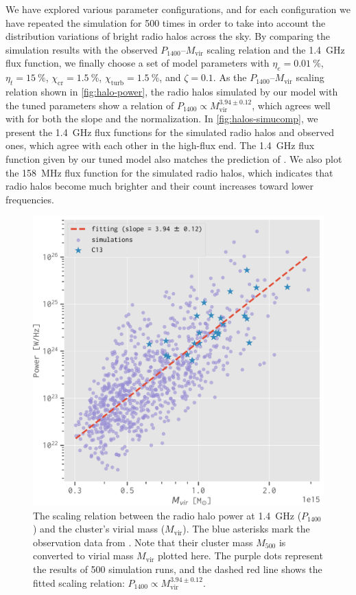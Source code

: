 \documentclass[twocolumn]{aastex62}
\newcommand{\R}[1]{\mathrm{#1}}
\newcommand{\editone}[1]{{\leavevmode\color{cyan}#1}}
\begin{document}
We have explored various parameter configurations,
and for each configuration we have repeated the simulation for 500 times
in order to take into account the distribution variations of bright
radio halos across the sky.
\editone{%
By comparing the simulation results with the observed
$P_{1400}$--$M_{\R{vir}}$ scaling relation and the \SI{1.4}{\GHz} flux
function, we finally choose a set of model parameters with
$\eta_e = \SI{0.01}{\percent}$,
$\eta_t = \SI{15}{\percent}$,
$\chi_{\R{cr}} = \SI{1.5}{\percent}$,
$\chi_{\R{turb}} = \SI{1.5}{\percent}$,
and $\zeta = 0.1$.
As the $P_{1400}$--$M_{\R{vir}}$ scaling relation shown in
\autoref{fig:halo-power}, the radio halos simulated by our model with the
tuned parameters show a relation of
$P_{1400} \propto M_{\R{vir}}^{3.94 \pm 0.12}$, which agrees well with
\citet{cassano2013} for both the slope and the normalization.
In \autoref{fig:halos-simucomp}, we present the \SI{1.4}{\GHz} flux
functions for the simulated radio halos and observed ones, which agree with
each other in the high-flux end.
The \SI{1.4}{\GHz} flux function given by our tuned model also matches
the prediction of \citet{cassano2012}.
We also plot the \SI{158}{\MHz} flux function for the simulated radio
halos, which indicates that radio halos become much brighter and their
count increases toward lower frequencies.
}

\begin{figure}
  \centering
  \includegraphics[width=\columnwidth]{halo-power-mvir}
  \caption{\label{fig:halo-power}\editone{%
    The scaling relation between the radio halo power at \SI{1.4}{\GHz}
    ($P_{1400}$) and the cluster's virial mass ($M_{\R{vir}}$).
    The blue asterisks mark the observation data from \citet{cassano2013}.
    Note that their cluster mass $M_{500}$ is converted to virial mass
    $M_{\R{vir}}$ plotted here.
    The purple dots represent the results of 500 simulation runs, and the
    dashed red line shows the fitted scaling relation:
    $P_{1400} \propto M_{\R{vir}}^{3.94 \pm 0.12}$.
  }}
\end{figure}
\end{document}
